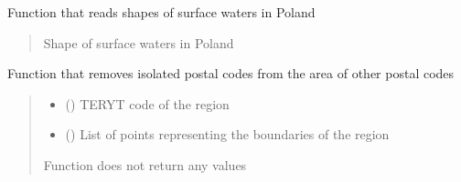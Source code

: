 \documentclass[letterpaper,10pt,english]{sphinxmanual}
\begin{document}

\begin{fulllineitems}
\label{\detokenize{pcm_utilities:pcm_utilities.read_wod_pow_shapes}}
\pysigstartsignatures
{}
\pysigstopsignatures
\sphinxAtStartPar
Function that reads shapes of surface waters in Poland
\begin{quote}\begin{description}
\sphinxAtStartPar
{}

\sphinxAtStartPar
Shape of surface waters in Poland

\end{description}\end{quote}

\end{fulllineitems}


\begin{fulllineitems}
\label{\detokenize{pcm_utilities:pcm_utilities.rmv_isl_pc}}
\pysigstartsignatures
{}
\pysigstopsignatures
\sphinxAtStartPar
Function that removes isolated postal codes from the area of other postal codes
\begin{quote}\begin{description}
\begin{itemize}
\item {} 
\sphinxAtStartPar
{} () \textendash{} TERYT code of the region

\item {} 
\sphinxAtStartPar
{} () \textendash{} List of points representing the boundaries of the region

\end{itemize}

\sphinxAtStartPar
{}

\sphinxAtStartPar
Function does not return any values

\end{description}\end{quote}

\end{fulllineitems}
\end{document}
